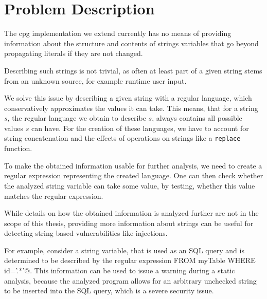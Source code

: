 \chapter{Problem Description}
\label{chapter:ProblemDescription}

The \ac{cpg} implementation we extend currently has no means of providing information about the structure and contents of strings variables that go beyond propagating literals if they are not changed.

Describing such strings is not trivial, as often at least part of a given string stems from an unknown source, for example runtime user input.

We solve this issue by describing a given string with a regular language, which conservatively approximates the values it can take.
This means, that for a string $s$, the regular language we obtain to describe $s$, always contains all possible values $s$ can have.
For the creation of these languages, we have to account for string concatenation and the effects of operations on strings like a \lstinline|replace| function.

To make the obtained information usable for further analysis, we need to create a regular expression representing the created language. One can then check whether the analyzed string variable can take some value, by testing, whether this value matches the regular expression.

While details on how the obtained information is analyzed further are not in the scope of this thesis, providing more information about strings can be useful for detecting string based vulnerabilities like injections.

For example, consider a string variable, that is used as an SQL query and is determined to be described by the regular expression \Verb@DELETE \* FROM myTable WHERE id='.*'@.
This information can be used to issue a warning during a static analysis, because the analyzed program allows for an arbitrary unchecked string to be inserted into the SQL query, which is a severe security issue.

\begin{comment}
	
The introduction is a bit like a teaser. Here, you dig more into details, also
technical ones. After this chapter, the reader must understand why you do this
work, why it's important, what makes it difficult and what you want to achieve.

\begin{itemize}
\item What's the problem that you're trying to solve?
\item What is your goal?
\item What is/are the research question(s)?
\item What are special problems?
\end{itemize}

Probably 1-3 pages

\end{comment}
